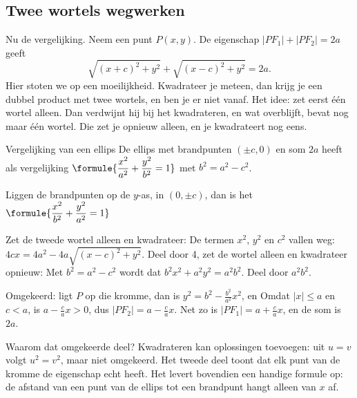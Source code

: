 \subsection{Twee wortels wegwerken}

Nu de vergelijking. Neem een punt $P(x, y)$. De eigenschap $|PF_1| + |PF_2| = 2a$ geeft
\[ \sqrt{(x + c)^2 + y^2} + \sqrt{(x - c)^2 + y^2} = 2a . \]
Hier stoten we op een moeilijkheid. Kwadrateer je meteen, dan krijg je een dubbel product met twee wortels, en ben je er niet vanaf. Het idee: zet eerst één wortel alleen. Dan verdwijnt hij bij het kwadrateren, en wat overblijft, bevat nog maar één wortel. Die zet je opnieuw alleen, en je kwadrateert nog eens.

\begin{theorie}
\begin{stelling}{Vergelijking van een ellips}
De ellips met brandpunten $(\pm c, 0)$ en som $2a$ heeft als vergelijking \qquad $\formule{\dfrac{x^2}{a^2} + \dfrac{y^2}{b^2} = 1}$ \quad met $b^2 = a^2 - c^2$.

\vspace{1mm}
Liggen de brandpunten op de $y$-as, in $(0, \pm c)$, dan is het \qquad $\formule{\dfrac{x^2}{b^2} + \dfrac{y^2}{a^2} = 1}$
\end{stelling}

\begin{bewijs}
Zet de tweede wortel alleen en kwadrateer:
De termen $x^2$, $y^2$ en $c^2$ vallen weg: $4cx = 4a^2 - 4a\sqrt{(x - c)^2 + y^2}$. Deel door 4, zet de wortel alleen en kwadrateer opnieuw:
Met $b^2 = a^2 - c^2$ wordt dat $b^2x^2 + a^2y^2 = a^2b^2$. Deel door $a^2b^2$.

Omgekeerd: ligt $P$ op die kromme, dan is $y^2 = b^2 - \tfrac{b^2}{a^2}x^2$, en
Omdat $|x| \leqslant a$ en $c < a$, is $a - \tfrac ca x > 0$, dus $|PF_2| = a - \tfrac ca x$. Net zo is $|PF_1| = a + \tfrac ca x$, en de som is $2a$.
\end{bewijs}
\end{theorie}

Waarom dat omgekeerde deel? Kwadrateren kan oplossingen toevoegen: uit $u = v$ volgt $u^2 = v^2$, maar niet omgekeerd. Het tweede deel toont dat elk punt van de kromme de eigenschap echt heeft. Het levert bovendien een handige formule op: de afstand van een punt van de ellips tot een brandpunt hangt alleen van $x$ af.

